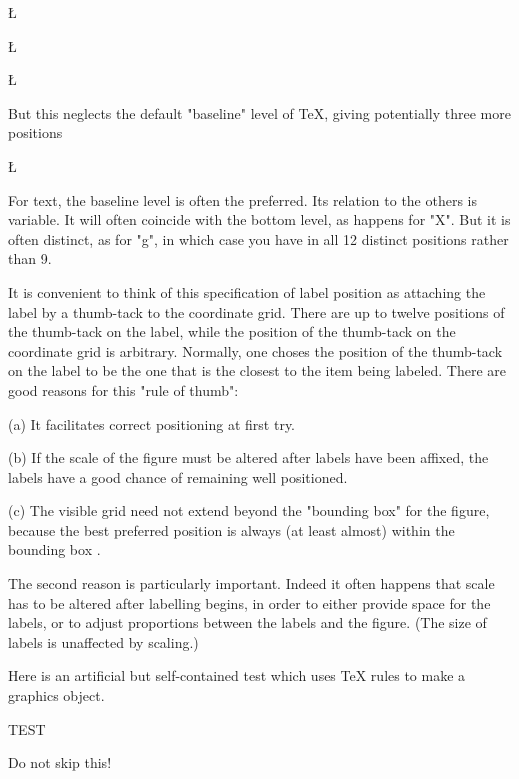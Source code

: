                      \L\T     \T      \R\T

                     \L\E     \E      \R\E

                     \L\B     \B      \R\B

But this neglects the default "baseline" level of TeX,
giving potentially three more positions

                     \L    <no tag>   \R

For text, the baseline level is often the preferred. Its relation to
the others is variable. It will often coincide with the bottom level,
as happens for "X".  But it is often distinct, as for "g", in which
case you have in all 12 distinct positions rather than 9.

     It is convenient to think of this specification of label
position as attaching the label by a thumb-tack to the coordinate
grid. There are up to twelve positions of the thumb-tack on the
label, while the position of the thumb-tack on the coordinate grid is
arbitrary.  Normally, one choses the position of the thumb-tack on
the label to be the one that is the closest to the item being
labeled.  There are good reasons for this "rule of thumb":

   (a)  It facilitates correct positioning at first try.

   (b)  If the scale of the figure must be altered after labels
have been affixed, the labels have a good chance of remaining well
positioned.

   (c)  The visible grid need not extend beyond the "bounding box"
for the figure, because the best preferred position is always
(at least almost) within the bounding box .

The second reason is particularly important. Indeed it often
happens that scale has to be altered after labelling begins, in
order to either provide space for the labels, or to adjust
proportions between the labels and the figure.  (The size of labels
is unaffected by scaling.)

     Here is an artificial but self-contained test which uses
TeX rules to make a graphics object.

TEST

    Do not skip this!




 \def\FrameIt#1{\hbox{\vrule$\vcenter {\hrule\kern3pt%
             \hbox {\kern3pt #1\kern3pt}%
               \kern3pt\hrule}$\relax\vrule}}

